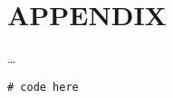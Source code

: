 
\section{APPENDIX} \label{sec:appendix}

    \ldots


    \begin{lstlisting}[caption={Snipped name}, label={lst:}]
        # code here
    \end{lstlisting}
